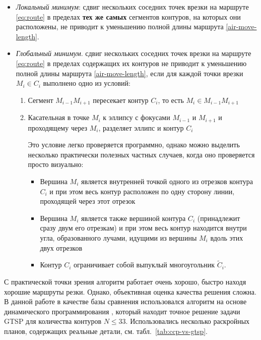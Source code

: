 \begin{itemize}
  \item
  {\it Локальный минимум}:
  сдвиг нескольких соседних точек врезки на маршруте \eqref{eq:route}
  в пределах {\bf тех же самых} сегментов контуров,
  на которых они расположены,
  не приводит к уменьшению полной длины маршрута \eqref{air-move-length}.
  \item
  {\it Глобальный минимум}.
  сдвиг нескольких соседних точек врезки на маршруте \eqref{eq:route}
  в пределах содержащих их контуров
  не приводит к уменьшению полной длины маршрута \eqref{air-move-length},
  если для каждой  точки врезки $M_i \in C_i$ выполнено одно из условий:
  \begin{enumerate}
    \item
    Сегмент
    $M_{i-1} M_{i+1}$
    пересекает контур
    $C_i$,
    то есть
    $M_i \in M_{i-1} M_{i+1}$
    \item
    Касательная в точке
    $M_i$
    к эллипсу с фокусами
    $M_{i-1}$
    и
    $M_{i+1}$
    и проходящему через
    $M_i$,
    разделяет эллипс и контур
    $C_i$

    Это условие легко проверяется программно,
    однако можно выделить несколько практически полезных частных случаев,
    когда оно проверяется просто визуально:
    \begin{itemize}
      \item
      Вершина
      $M_i$
      является внутренней точкой одного из
      отрезков контура
      $C_i$
      и при этом весь контур расположен
      по одну сторону линии,
      проходящей через этот отрезок
      \item
      Вершина
      $M_i$
      является также вершиной контура
      $C_i$
      (принадлежит сразу двум его отрезкам)
      и при этом весь контур находится
      внутри угла,
      образованного лучами,
      идущими из вершины
      $M_i$
      вдоль этих двух отрезков
      \item
      Контур
      $C_i$
      ограничивает собой выпуклый
      многоугольник
      $\widetilde C_i$.
    \end{itemize}
  \end{enumerate}
\end{itemize}

С практической точки зрения
алгоритм работает очень хорошо,
быстро находя хорошие маршруты резки.
Однако, объективная оценка качества решения сложна.
В данной работе в качестве базы сравнения использовался алгоритм
на основе динамического программирования
\autocite{bi:RoMa},
который находит точное решение задачи GTSP
для количества контуров
$N \leqslant 33$.
Использовались несколько раскройных планов,
содержащих реальные детали,
см. табл.~\ref{tab:ccp-vs-gtsp}.

